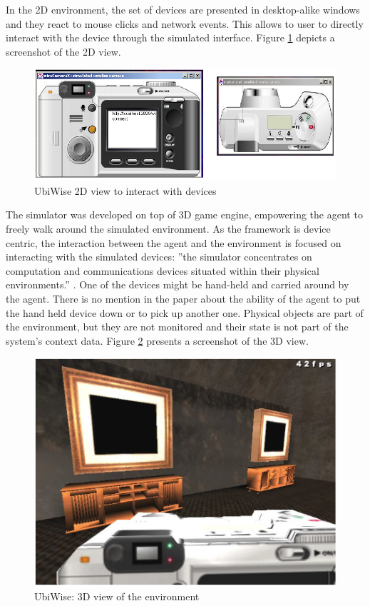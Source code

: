 In the 2D environment, the set of devices are presented in desktop-alike windows and they react to mouse clicks and network events. This allows to user to directly interact with the device through the simulated interface. Figure \ref{fig:ubiwise_2d_view} depicts a screenshot of the 2D view.\\
\begin{figure}[H]
	\centering
	\includegraphics[width=\linewidth]{gfx/Chapter2/ubiwise_2d_view}
	\caption{UbiWise 2D view to interact with devices}
	\label{fig:ubiwise_2d_view}
\end{figure}

The simulator was developed on top of 3D game engine, empowering the agent to freely walk around the simulated environment. As the framework is device centric, the interaction between the agent and the environment is focused on interacting with the simulated devices: ''the simulator concentrates on computation and communications devices
situated within their physical environments.'' \cite{barton2003ubiwise}. One of the devices might be hand-held and carried around by the agent. There is no mention in the paper about the ability of the agent to put the hand held device down or to pick up another one. Physical objects are part of the environment, but they are not monitored and their state is not part of the system's context data. Figure \ref{fig:ubiwise_3d_view} presents a screenshot of the 3D view.\\
\begin{figure}[H]
	\centering
	\includegraphics[width=\linewidth]{gfx/Chapter2/ubiwise_3d_view}
	\caption{UbiWise: 3D view of the environment}
	\label{fig:ubiwise_3d_view}
\end{figure}


